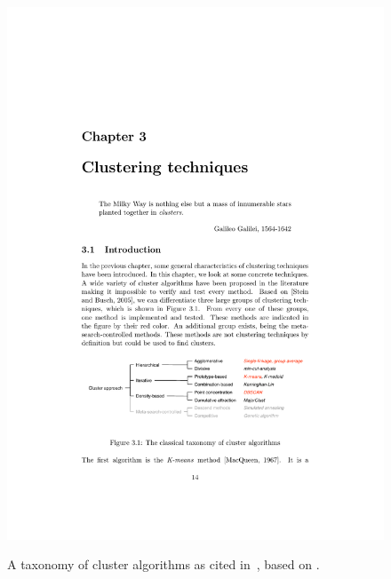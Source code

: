 \begin{figure}[h]
  \begin{center}
    \includegraphics[width=1\textwidth]{figures/clustering_techniques_meert.pdf}
    \label{fig:clusters}
    \caption{A taxonomy of cluster algorithms as cited in~\cite[p 14]{Meert06clustermaps}, based on \cite{Stein05density}.}
  \end{center}
\end{figure}

